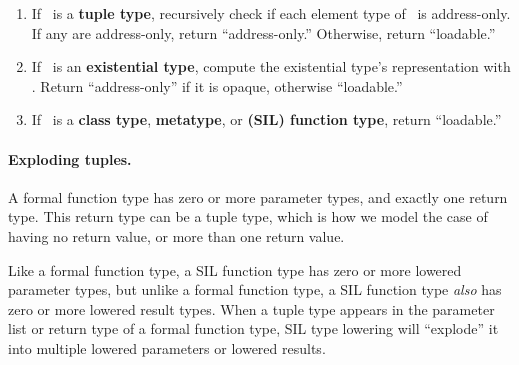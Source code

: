 \documentclass[../generics]{subfiles}
\begin{document}
\begin{algorithm}
\begin{enumerate}
\begin{enumerate}
(The lowered type of an \texttt{indirect} case is always a reference-counted pointer to a heap-allocated box, and such a pointer is loadable. If the enum itself is \texttt{indirect}, we proceed as if each case was \texttt{indirect}.)
\end{enumerate}

\item If \tX\ is a \textbf{tuple type}, recursively check if each element type of \tX\ is address-only. If any are address-only, return ``address-only.'' Otherwise, return ``loadable.''

\item If \tX\ is an \textbf{existential type}, compute the existential type's representation with . Return ``address-only'' if it is opaque, otherwise ``loadable.''

\item If \tX\ is a \textbf{class type}, \textbf{metatype}, or \textbf{(SIL) function type}, return ``loadable.''
\end{enumerate}
\end{algorithm}

\paragraph{Exploding tuples.}
A formal function type has zero or more parameter types, and exactly one return type. This return type can be a tuple type, which is how we model the case of having no return value, or more than one return value.

Like a formal function type, a SIL function type has zero or more lowered parameter types, but unlike a formal function type, a SIL function type \emph{also} has zero or more lowered result types. When a tuple type appears in the parameter list or return type of a formal function type, SIL type lowering will ``explode'' it into multiple lowered parameters or lowered results.
\end{document}

